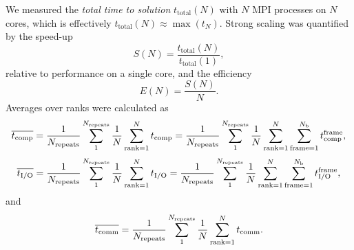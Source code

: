 We measured the \emph{total time to solution} $t_{\text{total}}(N)$ with $N$ MPI processes on $N$ cores, which is effectively
$t_{\text{total}}(N) \approx \max(t_{N})$. 
Strong scaling was quantified by the speed-up
\begin{equation}
  \label{eq:speedup}
  S(N) = \frac{t_{\text{total}}(N)}{t_{\text{total}}(1)},
\end{equation}
relative to performance on a single core, and the efficiency
\begin{equation}
  \label{eq:efficiency}
  E(N) = \frac{S(N)}{N}.
\end{equation}
Averages over ranks were calculated as
\begin{equation}
  \label{eq:avg-tcomp}
  \overline{{t}_{\text{comp}}} = \frac{1}{N_{\text{repeats}}}\sum_{1}^{N_{\text{repeats}}}\frac{1}{N}
  \sum_{\text{rank}=1}^{N}{t}_{\text{comp}} = \frac{1}{N_{\text{repeats}}}\sum_{1}^{N_{\text{repeats}}}\frac{1}{N}\sum_{\text{rank}=1}^{N}\sum_{\text{frame}=1}^{N_\text{b}}{t}_{\text{comp}}^{\text{frame}},
\end{equation}
\begin{equation}
  \label{eq:avg-tIO}
  \overline{{t}_{\text{I/O}}} = \frac{1}{N_{\text{repeats}}}\sum_{1}^{N_{\text{repeats}}}\frac{1}{N}\sum_{\text{rank}=1}^{N}{t}_{\text{I/O}} = \frac{1}{N_{\text{repeats}}}\sum_{1}^{N_{\text{repeats}}}\frac{1}{N}\sum_{\text{rank}=1}^{N}\sum_{\text{frame}=1}^{N_{\text{b}}}{t}_{\text{I/O}}^{\text{frame}},
\end{equation}
and
\begin{equation}
  \label{eq:avg-tcomm}
  \overline{t_{\text{comm}}} = \frac{1}{N_{\text{repeats}}}\sum_{1}^{N_{\text{repeats}}}\frac{1}{N}\sum_{\text{rank}=1}^{N}t_{\text{comm}}.
\end{equation}

